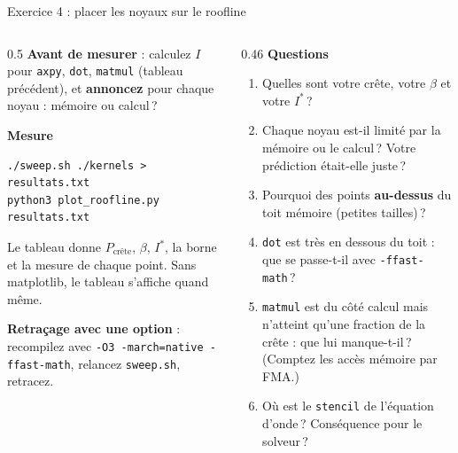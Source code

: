 \documentclass[8pt,aspectratio=169]{beamer}
\begin{document}
\begin{frame}[fragile]{Exercice 4 : placer les noyaux sur le roofline}
\begin{columns}[T]
\begin{column}{0.5\textwidth}
\textbf{Avant de mesurer} : calculez $I$ pour \texttt{axpy}, \texttt{dot}, \texttt{matmul} (tableau précédent), et \textbf{annoncez} pour chaque noyau : mémoire ou calcul\,?

\medskip
\textbf{Mesure}
\begin{verbatim}
./sweep.sh ./kernels > resultats.txt
python3 plot_roofline.py resultats.txt
\end{verbatim}
Le tableau donne $P_{\text{crête}}$, $\beta$, $I^*$, la borne et la mesure de chaque point. Sans matplotlib, le tableau s'affiche quand même.

\medskip
\textbf{Retraçage avec une option} : recompilez avec \texttt{-O3 -march=native -ffast-math}, relancez \texttt{sweep.sh}, retracez.
\end{column}
\begin{column}{0.46\textwidth}
\textbf{Questions}
\begin{enumerate}
\item Quelles sont votre crête, votre $\beta$ et votre $I^*$\,?
\item Chaque noyau est-il limité par la mémoire ou le calcul\,? Votre prédiction était-elle juste\,?
\item Pourquoi des points \textbf{au-dessus} du toit mémoire (petites tailles)\,?
\item \texttt{dot} est très en dessous du toit : que se passe-t-il avec \texttt{-ffast-math}\,?
\item \texttt{matmul} est du côté calcul mais n'atteint qu'une fraction de la crête : que lui manque-t-il\,? (Comptez les accès mémoire par FMA.)
\item Où est le \texttt{stencil} de l'équation d'onde\,? Conséquence pour le solveur\,?
\end{enumerate}
\end{column}
\end{columns}
\end{frame}
\end{document}
